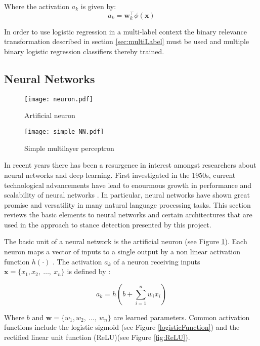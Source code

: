 \documentclass[Dissertation.tex]{subfiles}
\begin{document}
Where the activation $ a_k $ is given by:
 \[a_k =  \mathbf{w}_k^\top\phi(\mathbf{x})  \]
 
In order to use logistic regression in a multi-label context the binary relevance transformation described in section \ref{sec:multiLabel} must be used and multiple binary logistic regression classifiers thereby trained.

\subsection{Neural Networks}
\begin{figure}[h]

	\centering
	\texttt{[image: neuron.pdf]}

	\caption{Artificial neuron}
	\label{fig:neuron}
\end{figure}

\begin{figure}
	\centering
	\texttt{[image: simple\_NN.pdf]}
	\caption{Simple multilayer perceptron}
	\label{fig:multilayerPercep}
\end{figure}

In recent years there has been a resurgence in interest amongst researchers about neural networks and deep learning. First investigated in the 1950s, current technological advancements have lead to enourmous growth in performance and scalability of neural networks \cite{pattersonDeepLearningPractitioner2017}. In particular, neural networks have shown great promise and versatility in many natural language processing tasks. This section reviews the basic elements to neural networks and certain architectures that are used in the approach to stance detection presented by this project. 

The basic unit of a neural network is the artificial neuron (see Figure \ref{fig:neuron}). Each neuron maps a vector of inputs to a single output by a non linear activation function $ h(\cdot) $ \cite{pattersonDeepLearningPractitioner2017}. The activation $ a_k $ of a neuron receiving inputs $ \mathbf{x} = \{x_1,x_2,\ \dots,\ x_n\} $ is defined by \cite{pattersonDeepLearningPractitioner2017}:

\[ a_k = h(b + \sum_{i=1}^n w_ix_i) \]

Where $ b $ and $ \mathbf{w} = \{w_1,w_2, \ \dots, \ w_n\} $ are learned parameters. Common activation functions include the logistic sigmoid (see Figure \ref{logisticFunction}) and the rectified linear unit function (ReLU)(see Figure \ref{fig:ReLU}).
\end{document}
